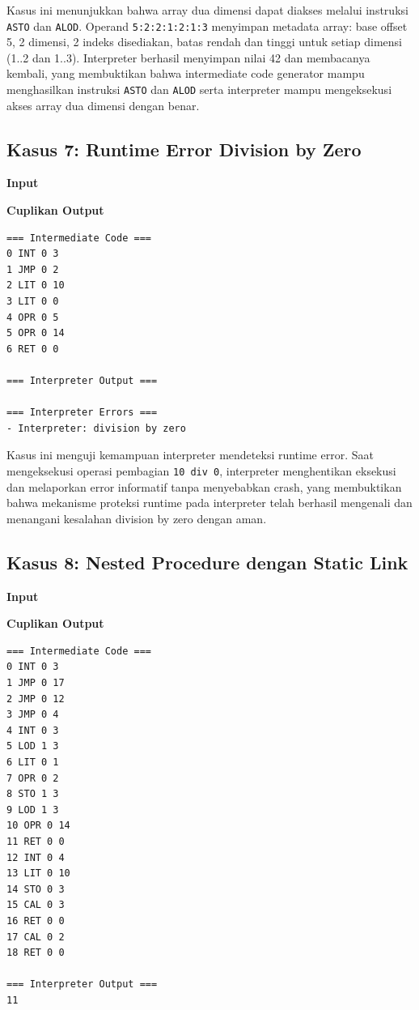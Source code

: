 Kasus ini menunjukkan bahwa array dua dimensi dapat diakses melalui instruksi \texttt{ASTO} dan \texttt{ALOD}. Operand \texttt{5:2:2:1:2:1:3} menyimpan metadata array: base offset 5, 2 dimensi, 2 indeks disediakan, batas rendah dan tinggi untuk setiap dimensi (1..2 dan 1..3). Interpreter berhasil menyimpan nilai 42 dan membacanya kembali, yang membuktikan bahwa intermediate code generator mampu menghasilkan instruksi \texttt{ASTO} dan \texttt{ALOD} serta interpreter mampu mengeksekusi akses array dua dimensi dengan benar.

\subsection{Kasus 7: Runtime Error Division by Zero}
\textbf{Input}\par


\textbf{Cuplikan Output}\par
\begin{lstlisting}[basicstyle=\ttfamily\scriptsize,breaklines=true,frame=single,numbers=none]
=== Intermediate Code ===
0 INT 0 3
1 JMP 0 2
2 LIT 0 10
3 LIT 0 0
4 OPR 0 5
5 OPR 0 14
6 RET 0 0

=== Interpreter Output ===

=== Interpreter Errors ===
- Interpreter: division by zero
\end{lstlisting}

Kasus ini menguji kemampuan interpreter mendeteksi runtime error. Saat mengeksekusi operasi pembagian \texttt{10 div 0}, interpreter menghentikan eksekusi dan melaporkan error informatif tanpa menyebabkan crash, yang membuktikan bahwa mekanisme proteksi runtime pada interpreter telah berhasil mengenali dan menangani kesalahan division by zero dengan aman.

\subsection{Kasus 8: Nested Procedure dengan Static Link}
\textbf{Input}\par


\textbf{Cuplikan Output}\par
\begin{lstlisting}[basicstyle=\ttfamily\scriptsize,breaklines=true,frame=single,numbers=none]
=== Intermediate Code ===
0 INT 0 3
1 JMP 0 17
2 JMP 0 12
3 JMP 0 4
4 INT 0 3
5 LOD 1 3
6 LIT 0 1
7 OPR 0 2
8 STO 1 3
9 LOD 1 3
10 OPR 0 14
11 RET 0 0
12 INT 0 4
13 LIT 0 10
14 STO 0 3
15 CAL 0 3
16 RET 0 0
17 CAL 0 2
18 RET 0 0

=== Interpreter Output ===
11
\end{lstlisting}

